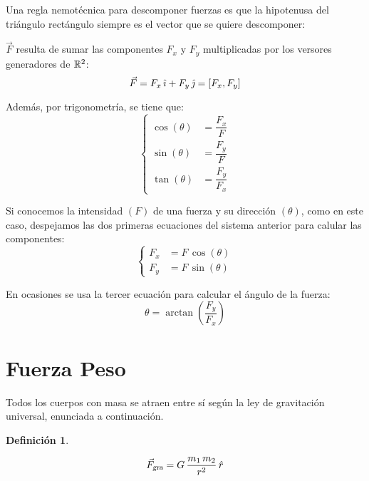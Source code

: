 \documentclass[a5paper,12pt,twoside]{book}
\newtheorem{defn}{{Definición}}[chapter]
\begin{document}
\begin{center}
    \vspace{-6cm}
    \def\svgwidth{\linewidth}
    
    \vspace{-6cm}
\end{center}

Una regla nemotécnica para descomponer fuerzas es que la hipotenusa del triángulo rectángulo siempre es el vector que se quiere descomponer:

\begin{center}
    \vspace{-6cm}
    \def\svgwidth{\linewidth}
    
\end{center}

$\Vec{F}$ resulta de sumar las componentes $F_x$ y $F_y$ multiplicadas por los versores generadores de $\mathbb{R}^2$:
\[ \Vec{F} = F_x \, \hat{\imath} + F_y \, \hat{\jmath} = [F_x,F_y] \]

Además, por trigonometría, se tiene que:
\[
  \left\{
    \begin{aligned}
      \cos{(\theta)} &= \dfrac{F_x}{F}
      \\[1ex]
      \sin{(\theta)} &= \dfrac{F_y}{F}
      \\[1ex]
      \tan{(\theta)} &= \dfrac{F_y}{F_x}
    \end{aligned}
  \right.
\]

Si conocemos la intensidad $(F)$ de una fuerza y su dirección $(\theta)$, como en este caso, despejamos las dos primeras ecuaciones del sistema anterior para calular las componentes:
\[
  \left\{
  \begin{aligned}
    F_x &= F \, \cos{(\theta)}
    \\
    F_y &= F \, \sin{(\theta)}
  \end{aligned}
  \right.
\]

En ocasiones se usa la tercer ecuación para calcular el ángulo de la fuerza:
\[ \theta = \arctan{ \left( \dfrac{F_y}{F_x} \right) } \]


\section{Fuerza Peso}

Todos los cuerpos con masa se atraen entre sí según la ley de gravitación universal, enunciada a continuación.

\begin{mdframed}[style=MyFrame1]
    \begin{defn}
    \end{defn}
    \begin{equation*}
        {{\vec{F}}_\textsl{{gra}}} = G \, \frac{m_1 \, m_2}{r^2} \, \hat{r}
    \end{equation*}
\end{mdframed}
\end{document}
